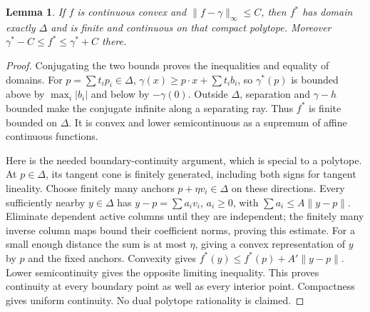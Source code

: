 \documentclass[11pt]{article}
\newtheorem{lemma}[theorem]{Lemma}
\begin{document}
\begin{lemma}\label{dualcompact}
If $f$ is continuous convex and $\|f-\gamma\|_\infty\leq C$, then
$f^*$ has domain exactly $\Delta$ and is finite and continuous on that
compact polytope. Moreover
$\gamma^*-C\leq f^*\leq\gamma^*+C$ there.
\end{lemma}
\begin{proof}
Conjugating the two bounds proves the inequalities and equality of
domains. For $p=\sum t_i p_i\in\Delta$,
$\gamma(x)\geq p\cdot x+\sum t_i b_i$, so $\gamma^*(p)$ is bounded
above by $\max_i|b_i|$ and below by $-\gamma(0)$. Outside $\Delta$,
separation and $\gamma-h$ bounded make the conjugate infinite along
a separating ray. Thus $f^*$ is finite bounded on $\Delta$. It is
convex and lower semicontinuous as a supremum of affine continuous
functions.

Here is the needed boundary-continuity argument, which is special to
a polytope. At $p\in\Delta$, its tangent cone is finitely generated,
including both signs for tangent lineality. Choose finitely many
anchors $p+\eta v_i\in\Delta$ on these directions. Every sufficiently
nearby $y\in\Delta$ has $y-p=\sum a_i v_i$, $a_i\geq0$, with
$\sum a_i\leq A\|y-p\|$. Eliminate dependent active columns until
they are independent; the finitely many inverse column maps bound
their coefficient norms, proving this estimate. For a small enough
distance the sum is at most $\eta$, giving a convex representation
of $y$ by $p$ and the fixed anchors. Convexity gives
$f^*(y)\leq f^*(p)+A'\|y-p\|$. Lower semicontinuity gives the
opposite limiting inequality. This proves continuity at every boundary
point as well as every interior point. Compactness gives uniform
continuity. No dual polytope rationality is claimed.
\end{proof}
\end{document}
